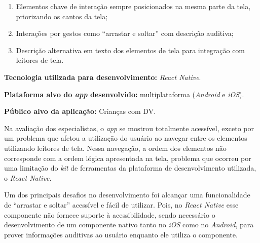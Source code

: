 \begin{enumerate}
\item Elementos chave de interação sempre posicionados na mesma parte da tela, priorizando os cantos da tela;
\item Interações por gestos como ``arrastar e soltar'' com descrição auditiva;
\item Descrição alternativa em texto dos elementos de tela para integração com leitores de tela.
\end{enumerate}

\textbf{Tecnologia utilizada para desenvolvimento:} \emph{React Native}.

\textbf{Plataforma alvo do \emph{app} desenvolvido:} multiplataforma (\emph{Android} e \emph{iOS}).

\textbf{Público alvo da aplicação:} Crianças com DV\@.

Na avaliação dos especialistas, o \emph{app} se mostrou totalmente acessível, exceto por um problema que afetou a utilização do usuário ao navegar entre os elementos utilizando leitores de tela.
Nessa navegação, a ordem dos elementos não corresponde com a ordem lógica apresentada na tela, problema que ocorreu por uma limitação do \emph{kit} de ferramentas da plataforma de desenvolvimento utilizada, o \emph{React Native}.

Um dos principais desafios no desenvolvimento foi alcançar uma funcionalidade de ``arrastar e soltar'' acessível e fácil de utilizar.
Pois, no \emph{React Native} esse componente não fornece suporte à acessibilidade, sendo necessário o desenvolvimento de um componente nativo tanto no \emph{iOS} como no \emph{Android}, para prover informações auditivas ao usuário enquanto ele utiliza o componente.
